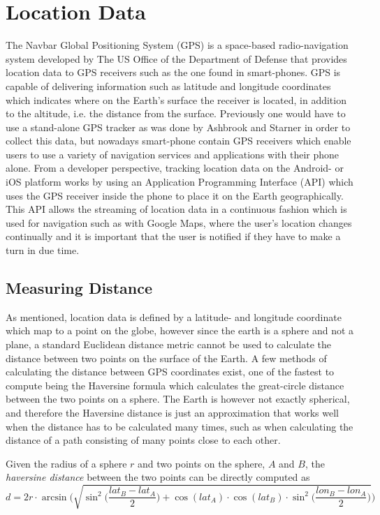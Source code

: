 \section{Location Data}
The Navbar Global Positioning System (GPS) is a space-based radio-navigation system developed by The US Office of the Department of Defense \cite{gps-navstar} that provides location data to GPS receivers such as the one found in smart-phones. GPS is capable of delivering information such as latitude and longitude coordinates which indicates where on the Earth's surface the receiver is located, in addition to the altitude, i.e. the distance from the surface. Previously one would have to use a stand-alone GPS tracker as was done by Ashbrook and Starner \cite{using_gps_to_learn_significant_locations} in order to collect this data, but nowadays smart-phone contain GPS receivers which enable users to use a variety of navigation services and applications with their phone alone. From a developer perspective,  tracking location data on the Android- or iOS platform works by using an Application Programming Interface (API) which uses the GPS receiver inside the phone to place it on the Earth geographically. This API allows the streaming of location data in a continuous fashion which is used for navigation such as with Google Maps, where the user's location changes continually and it is important that the user is notified if they have to make a turn in due time. 

\subsection{Measuring Distance}
As mentioned, location data is defined by a latitude- and longitude coordinate which map to a point on the globe, however since the earth is a sphere and not a plane, a standard Euclidean distance metric cannot be used to calculate the distance between two points on the surface of the Earth. A few methods of calculating the distance between GPS coordinates exist, one of the fastest to compute being the Haversine formula \cite{haversine-formula} which calculates the great-circle distance between the two points on a sphere. The Earth is however not exactly spherical, and therefore the Haversine distance is just an approximation that works well when the distance has to be calculated many times, such as when calculating the distance of a path consisting of many points close to each other.

Given the radius of a sphere $r$ and two points on the sphere, $A$ and $B$, the \textit{haversine distance} between the two points can be directly computed as 
$$d = 2r \cdot \arcsin \Bigg( \sqrt{\sin^2 \bigg( \frac{lat_B - lat_A}{2} \bigg) + \cos(lat_A) \cdot \cos(lat_B) \cdot \sin^2 \bigg(\frac{ lon_B - lon_A}{2} \bigg)}\Bigg)$$
